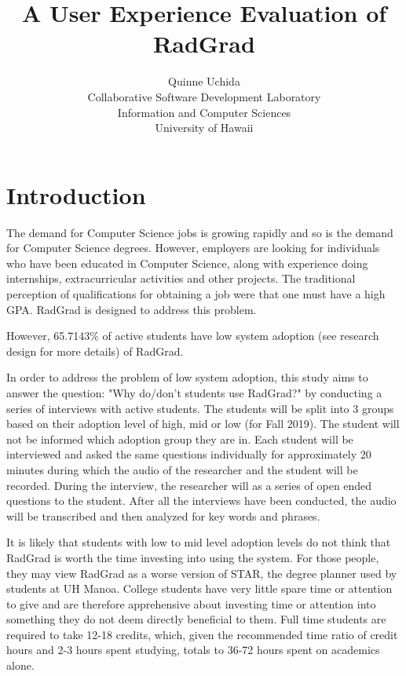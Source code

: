 \documentclass[english]{proposalnsf}
\title{A User Experience Evaluation of RadGrad}
\author{Quinne Uchida \\Collaborative Software Development Laboratory \\ Information and Computer Sciences \\ University of Hawaii}
\begin{document}
\maketitle
\tableofcontents
\newpage

\section{Introduction}
\label{introduction}

The demand for Computer Science jobs is growing rapidly and so is the demand for Computer Science degrees. However, employers are looking for individuals who have been educated in Computer Science, along with experience doing internships, extracurricular activities and other projects. The traditional perception of qualifications for obtaining a job were that one must have a high GPA. RadGrad is designed to address this problem. 

However, 65.7143{\%} of active students have low system adoption (see research design for more details) of RadGrad. 

In order to address the problem of low system adoption, this study aims to answer the question: "Why do/don't students use RadGrad?" by conducting a series of interviews with active students. 
The students will be split into 3 groups based on their adoption level of high, mid or low (for Fall 2019). The student will not be informed which adoption group they are in. Each student will be interviewed and asked the same questions individually for approximately 20 minutes during which the audio of the researcher and the student will be recorded. During the interview, the researcher will as a series of open ended questions to the student. After all the interviews have been conducted, the audio will be transcribed and then analyzed for key words and phrases.

It is likely that students with low to mid level adoption levels do not think that RadGrad is worth the time investing into using the system. For those people, they may view RadGrad as a worse version of STAR, the degree planner used by students at UH Manoa. College students have very little spare time or attention to give and are therefore apprehensive about investing time or attention into something they do not deem directly beneficial to them. 
Full time students are required to take 12-18 credits, which, given the recommended time ratio of credit hours and 2-3 hours spent studying, totals to 36-72 hours spent on academics alone. 
\end{document}
